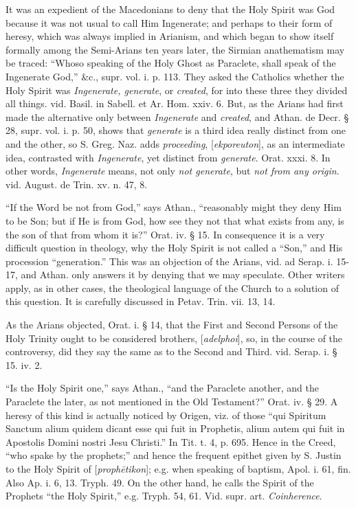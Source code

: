 It was an expedient of the Macedonians to deny
that the Holy Spirit was God because it was not usual to call
Him Ingenerate; and perhaps to their form of heresy, which was always
implied in Arianism, and which began to show itself formally among the
Semi-Arians ten years later, the Sirmian anathematism may be traced: ``Whoso
speaking of the Holy Ghost as Paraclete, shall speak of the Ingenerate
God,'' \&c., supr. vol. i. p. 113. They asked the Catholics whether
the Holy Spirit was \emph{Ingenerate, generate}, or \emph{created},
for into these three they divided all things. vid. Basil. in Sabell.
et Ar. Hom. xxiv. 6. But, as the Arians had first made the alternative
only between \emph{Ingenerate} and \emph{created}, and Athan. de Decr.
§ 28, supr. vol. i. p. 50, shows that \emph{generate} is a third idea
really distinct from one and the other, so S. Greg. Naz. adds \emph{proceeding},
[\emph{ekporeuton}], as an intermediate idea, contrasted with \emph{Ingenerate},
yet distinct from \emph{generate}. Orat. xxxi. 8. In other words, \emph{Ingenerate}
means, not only \emph{not generate}, but \emph{not from any origin}.
vid. August. de Trin. xv. n. 47, 8.

``If the Word be not from God,'' says Athan., ``reasonably
might they deny Him to be Son; but if He is from God, how see they not
that what exists from any, is the son of that from whom it is?'' Orat.
iv. § 15. In consequence it is a very difficult question in theology,
why the Holy Spirit is not called a ``Son,'' and His procession ``generation.''
This was an objection of the Arians, vid. ad Serap. i. 15-17, and
Athan. only answers it by denying that we may speculate. Other writers
apply, as in other cases, the theological language of the Church to a
solution of this question. It is carefully discussed in Petav. Trin.
vii. 13, 14.

As the Arians objected, Orat. i. § 14, that the
First and Second Persons of the Holy Trinity ought to be
considered brothers, [\emph{adelphoi}], so, in the course of the
controversy, did they say the same as to the Second and Third. vid.
Serap. i. § 15. iv. 2.

``Is the Holy Spirit one,'' says Athan., ``and the
Paraclete another, and the Paraclete the later, as not mentioned in
the Old Testament?'' Orat. iv. § 29. A heresy of this kind is actually
noticed by Origen, viz. of those ``qui Spiritum Sanctum alium quidem
dicant esse qui fuit in Prophetis, alium autem qui fuit in Apostolis
Domini nostri Jesu Christi.'' In Tit. t. 4, p. 695. Hence in the Creed,
``who spake by the prophets;'' and hence the frequent epithet given by
S. Justin to the Holy Spirit of [\emph{proph\={e}tikon}]; e.g. when
speaking of baptism, Apol. i. 61, fin. Also Ap. i. 6, 13. Tryph. 49.
On the other hand, he calls the Spirit of the Prophets ``the Holy
Spirit,'' e.g. Tryph. 54, 61. Vid. supr. art. \emph{Coinherence}.

